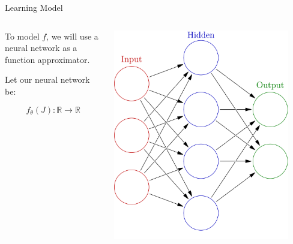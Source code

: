 \documentclass[aspectratio=169, 12pt]{beamer}
\begin{document}
\begin{frame}{Learning Model}


    \begin{columns}
        \begin{column}{.6\textwidth}
            
            To model $f$, we will use a neural network as a function approximator. 

            \vspace{1em}

            Let our neural network be:

            \[
            f_\theta(J) : \mathbb{R} \rightarrow \mathbb{R}
            \]
            
        \end{column}
        \begin{column}{.4\textwidth}
            \includegraphics[width=0.9\textwidth]{images/neural-network.png}
        \end{column}
    \end{columns}
    
\end{frame}
\end{document}
